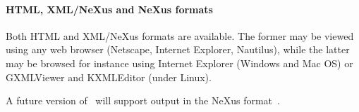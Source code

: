 \paragraph{HTML, XML/NeXus and NeXus formats}

Both HTML and XML/NeXus formats are available. The former may be viewed using any web browser (Netscape, Internet Explorer, Nautilus), while the latter may be browsed for instance using Internet Explorer (Windows and Mac OS) or GXMLViewer and KXMLEditor (under Linux).

A future version of \MCS\ will support output in the NeXus
format~\cite{nexus_webpage}.
